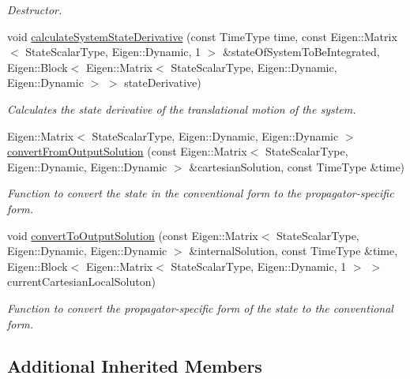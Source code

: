 \begin{DoxyCompactItemize}
\begin{DoxyCompactList}\small\item\em Destructor. \end{DoxyCompactList}\item 
void \hyperlink{classtudat_1_1propagators_1_1NBodyCowellStateDerivative_a0be6f4ae1ff3e940eabb556e87bea38e}{calculate\+System\+State\+Derivative} (const Time\+Type time, const Eigen\+::\+Matrix$<$ State\+Scalar\+Type, Eigen\+::\+Dynamic, 1 $>$ \&state\+Of\+System\+To\+Be\+Integrated, Eigen\+::\+Block$<$ Eigen\+::\+Matrix$<$ State\+Scalar\+Type, Eigen\+::\+Dynamic, Eigen\+::\+Dynamic $>$ $>$ state\+Derivative)
\begin{DoxyCompactList}\small\item\em Calculates the state derivative of the translational motion of the system. \end{DoxyCompactList}\item 
Eigen\+::\+Matrix$<$ State\+Scalar\+Type, Eigen\+::\+Dynamic, Eigen\+::\+Dynamic $>$ \hyperlink{classtudat_1_1propagators_1_1NBodyCowellStateDerivative_ac9b98ba54b33e191adf8c65c170eac57}{convert\+From\+Output\+Solution} (const Eigen\+::\+Matrix$<$ State\+Scalar\+Type, Eigen\+::\+Dynamic, Eigen\+::\+Dynamic $>$ \&cartesian\+Solution, const Time\+Type \&time)
\begin{DoxyCompactList}\small\item\em Function to convert the state in the conventional form to the propagator-\/specific form. \end{DoxyCompactList}\item 
void \hyperlink{classtudat_1_1propagators_1_1NBodyCowellStateDerivative_a5121de8ef25e600d6efa821aa03635c9}{convert\+To\+Output\+Solution} (const Eigen\+::\+Matrix$<$ State\+Scalar\+Type, Eigen\+::\+Dynamic, Eigen\+::\+Dynamic $>$ \&internal\+Solution, const Time\+Type \&time, Eigen\+::\+Block$<$ Eigen\+::\+Matrix$<$ State\+Scalar\+Type, Eigen\+::\+Dynamic, 1 $>$ $>$ current\+Cartesian\+Local\+Soluton)
\begin{DoxyCompactList}\small\item\em Function to convert the propagator-\/specific form of the state to the conventional form. \end{DoxyCompactList}\end{DoxyCompactItemize}
\subsection*{Additional Inherited Members}



